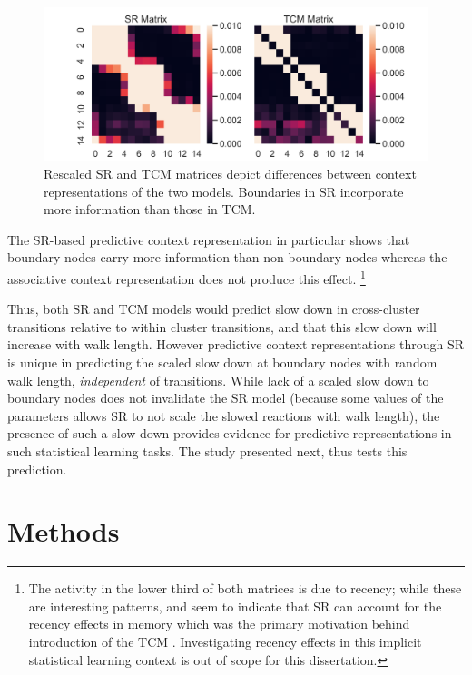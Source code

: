 \begin{figure}[ht]
	\centering
	\label{fig:zoomed-in-SRTCM-boundary-entropy}
	\includegraphics[width = \textwidth]{chapter_notebooks/chapter_2/figures/SR_vs_TCM_Matrices_zoomed.png}
	\caption{Rescaled SR and TCM matrices depict differences between context representations of the two models. Boundaries in SR incorporate more information than those in TCM.}
\end{figure}

The SR-based predictive context representation in particular shows that boundary nodes carry more information than non-boundary nodes whereas the associative context representation does not produce this effect. \footnote{The activity in the lower third of both matrices is due to recency; while these are interesting patterns, and seem to indicate that SR can account for the recency effects in memory which was the primary motivation behind introduction of the TCM \cite{gershman2012successor,howard2005temporal}. Investigating recency effects in this implicit statistical learning context is out of scope for this dissertation.}

Thus, both SR and TCM models would predict slow down in cross-cluster transitions relative to within cluster transitions, and that this slow down will increase with walk length. However predictive context representations through SR is unique in predicting the scaled slow down at boundary nodes with random walk length, \textit{independent} of transitions. While lack of a scaled slow down to boundary nodes does not invalidate the SR model (because some values of the parameters allows SR to not scale the slowed reactions with walk length), the presence of such a slow down provides evidence for predictive representations in such statistical learning tasks. The study presented next, thus tests this prediction. 

\section{Methods}

